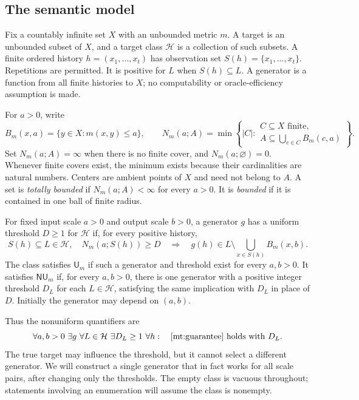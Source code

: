 \subsection{The semantic model}

Fix a countably infinite set $X$ with an unbounded metric $m$.
A target is an unbounded subset of $X$, and a target class $\mathcal H$
is a collection of such subsets. A finite ordered history
$h=(x_1,\ldots,x_t)$ has observation set
$S(h)=\{x_1,\ldots,x_t\}$. Repetitions are permitted. It is positive for
$L$ when $S(h)\subseteq L$. A generator is a function from all finite
histories to $X$; no computability or oracle-efficiency assumption is made.

For $a>0$, write
\[
 B_m(x,a)=\{y\in X:m(x,y)\le a\},
 \qquad
 N_m(a;A)=\min\left\{|C|:
 \begin{array}{l}
 C\subseteq X\text{ finite},\\[-2pt]
 A\subseteq\displaystyle\bigcup_{c\in C}B_m(c,a)
 \end{array}\right\}.
\]
Set $N_m(a;A)=\infty$ when there is no finite cover, and
$N_m(a;\varnothing)=0$. Whenever finite covers exist, the minimum exists
because their cardinalities are natural numbers. Centers are ambient
points of $X$ and need not belong to $A$. A set is \emph{totally bounded}
if $N_m(a;A)<\infty$ for every $a>0$. It is \emph{bounded} if it is
contained in one ball of finite radius.

\begin{definition}
\label{mt:model}
For fixed input scale $a>0$ and output scale $b>0$, a generator $g$ has a
uniform threshold $D\ge1$ for $\mathcal H$ if, for every positive history,
\begin{equation}
\label{mt:guarantee}
 S(h)\subseteq L\in\mathcal H,\quad N_m(a;S(h))\ge D
 \quad\Longrightarrow\quad
 g(h)\in L\setminus\bigcup_{x\in S(h)}B_m(x,b).
\end{equation}
The class satisfies $\mathsf U_m$ if such a generator and threshold exist
for every $a,b>0$. It satisfies $\mathsf{NU}_m$ if, for every $a,b>0$,
there is one generator with a positive integer threshold $D_L$ for each
$L\in\mathcal H$, satisfying the same implication with $D_L$ in place
of $D$. Initially the generator may depend on $(a,b)$.
\end{definition}

Thus the nonuniform quantifiers are
\[
 \forall a,b>0\ \exists g\ \forall L\in\mathcal H\ \exists D_L\ge1
 \ \forall h:\quad \text{\eqref{mt:guarantee} holds with }D_L.
\]
The true target may influence the threshold, but it cannot select a different
generator. We will construct a single generator that in fact works for
all scale pairs, after changing only the thresholds. The empty class is
vacuous throughout; statements involving an enumeration will assume the
class is nonempty.

